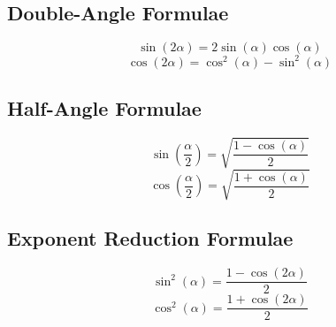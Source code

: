 	\subsection{Double-Angle Formulae} \label{subsec:Double-Angle Formulae}
		\begin{equation} \label{eq:Sin Double-Angle}
			\sin \left( 2 \alpha \right) = 2 \sin \left( \alpha \right) \cos \left( \alpha \right)
		\end{equation}
		\begin{equation} \label{eq:Cos Double-Angle}
			\cos \left( 2 \alpha \right) = \cos^{2} \left( \alpha \right) - \sin^{2} \left( \alpha \right)
		\end{equation}
		
	\subsection{Half-Angle Formulae} \label{subsec:Half-Angle Formulae}
		\begin{equation} \label{eq:Sin Half-Angle}
			\sin \left( \frac{\alpha}{2} \right) = \sqrt{\frac{1-\cos \left( \alpha \right)}{2}}
		\end{equation}
		\begin{equation} \label{eq:Cos Half-Angle}
			\cos \left( \frac{\alpha}{2} \right) = \sqrt{\frac{1+\cos \left( \alpha \right)}{2}}
		\end{equation}
	
	\subsection{Exponent Reduction Formulae} \label{subsec:Exponent Reduction Formula}
		\begin{equation} \label{eq:Sin Squared Reduction}
			\sin^{2} \left( \alpha \right) = \frac{1-\cos \left( 2 \alpha \right)}{2}
		\end{equation}
		\begin{equation} \label{eq:Cos Squared Reduction}
			\cos^{2} \left( \alpha \right) = \frac{1+\cos \left( 2 \alpha \right)}{2}
		\end{equation}
	
